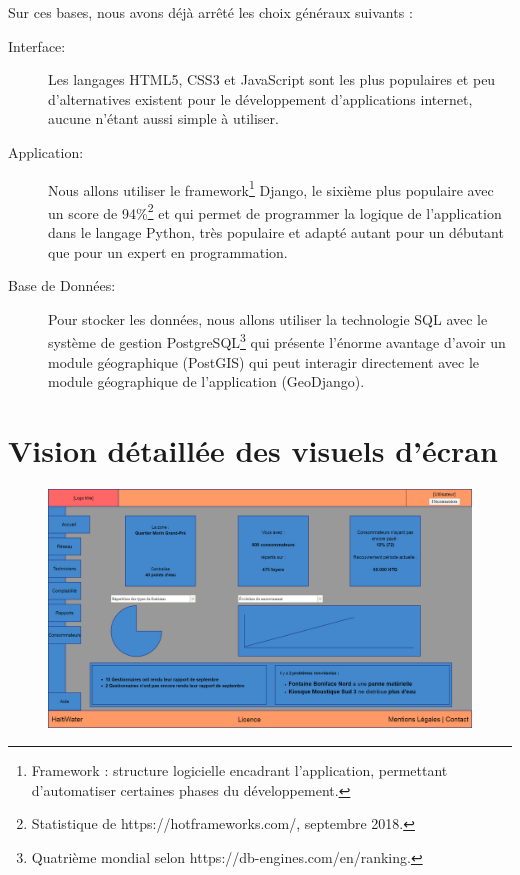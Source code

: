 \documentclass[a4paper, 11pt]{article}
\begin{document}
  Sur ces bases, nous avons déjà arrêté les choix généraux suivants :
  \begin{description}
    \item[Interface:] Les langages HTML5, CSS3 et JavaScript sont les plus populaires et peu d'alternatives existent pour le développement d'applications internet, aucune n'étant aussi simple à utiliser.
    \item[Application:] Nous allons utiliser le framework\footnote{Framework : structure logicielle encadrant l'application, permettant d'automatiser certaines phases du développement.} Django, le sixième plus populaire avec un score de 94\%\footnote{Statistique de https://hotframeworks.com/, septembre 2018.} et qui permet de programmer la logique de l'application dans le langage Python, très populaire et adapté autant pour un débutant que pour un expert en programmation.
    \item[Base de Données:] Pour stocker les données, nous allons utiliser la technologie SQL avec le système de gestion PostgreSQL\footnote{Quatrième mondial selon https://db-engines.com/en/ranking.} qui présente l'énorme avantage d'avoir un module géographique (PostGIS) qui peut interagir directement avec le module géographique de l'application (GeoDjango).
  \end{description}

\newpage

\appendix
\section{Vision détaillée des visuels d'écran \label{annexe}}
  \filbreak
  \begin{figure}[H] %
    \centering
    \includegraphics[scale=0.32, angle=90]{Cahier_des_Charges/accueil}
  \end{figure}
\end{document}
